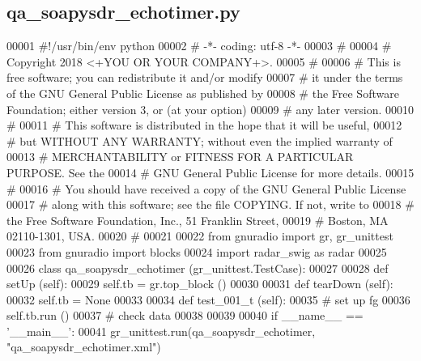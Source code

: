 \subsection{qa\+\_\+soapysdr\+\_\+echotimer.\+py}
\label{qa__soapysdr__echotimer_8py_source}

\begin{DoxyCode}
00001 \textcolor{comment}{#!/usr/bin/env python}
00002 \textcolor{comment}{# -*- coding: utf-8 -*-}
00003 \textcolor{comment}{# }
00004 \textcolor{comment}{# Copyright 2018 <+YOU OR YOUR COMPANY+>.}
00005 \textcolor{comment}{# }
00006 \textcolor{comment}{# This is free software; you can redistribute it and/or modify}
00007 \textcolor{comment}{# it under the terms of the GNU General Public License as published by}
00008 \textcolor{comment}{# the Free Software Foundation; either version 3, or (at your option)}
00009 \textcolor{comment}{# any later version.}
00010 \textcolor{comment}{# }
00011 \textcolor{comment}{# This software is distributed in the hope that it will be useful,}
00012 \textcolor{comment}{# but WITHOUT ANY WARRANTY; without even the implied warranty of}
00013 \textcolor{comment}{# MERCHANTABILITY or FITNESS FOR A PARTICULAR PURPOSE.  See the}
00014 \textcolor{comment}{# GNU General Public License for more details.}
00015 \textcolor{comment}{# }
00016 \textcolor{comment}{# You should have received a copy of the GNU General Public License}
00017 \textcolor{comment}{# along with this software; see the file COPYING.  If not, write to}
00018 \textcolor{comment}{# the Free Software Foundation, Inc., 51 Franklin Street,}
00019 \textcolor{comment}{# Boston, MA 02110-1301, USA.}
00020 \textcolor{comment}{# }
00021 
00022 \textcolor{keyword}{from} gnuradio \textcolor{keyword}{import} gr, gr\_unittest
00023 \textcolor{keyword}{from} gnuradio \textcolor{keyword}{import} blocks
00024 \textcolor{keyword}{import} radar\_swig \textcolor{keyword}{as} radar
00025 
00026 \textcolor{keyword}{class }qa_soapysdr_echotimer (gr\_unittest.TestCase):
00027 
00028     \textcolor{keyword}{def }setUp (self):
00029         self.tb = gr.top\_block ()
00030 
00031     \textcolor{keyword}{def }tearDown (self):
00032         self.tb = \textcolor{keywordtype}{None}
00033 
00034     \textcolor{keyword}{def }test_001_t (self):
00035         \textcolor{comment}{# set up fg}
00036         self.tb.run ()
00037         \textcolor{comment}{# check data}
00038 
00039 
00040 \textcolor{keywordflow}{if} \_\_name\_\_ == \textcolor{stringliteral}{'\_\_main\_\_'}:
00041     gr\_unittest.run(qa\_soapysdr\_echotimer, \textcolor{stringliteral}{"qa\_soapysdr\_echotimer.xml"})
\end{DoxyCode}
